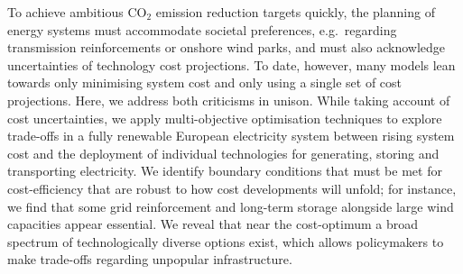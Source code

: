 To achieve ambitious CO$_2$ emission reduction targets quickly, the planning of
energy systems must accommodate societal preferences, e.g.~regarding
transmission reinforcements or onshore wind parks, and must also acknowledge
uncertainties of technology cost projections. To date, however, many models lean
towards only minimising system cost and only using a single set of cost
projections. Here, we address both criticisms in unison. While taking account of
cost uncertainties, we apply multi-objective optimisation techniques to explore
trade-offs in a fully renewable European electricity system between rising
system cost and the deployment of individual technologies for generating,
storing and transporting electricity. We identify boundary conditions that must
be met for cost-efficiency that are robust to how cost developments will unfold;
for instance, we find that some grid reinforcement and long-term storage
alongside large wind capacities appear essential. We reveal that near the
cost-optimum a broad spectrum of technologically diverse options exist, which
allows policymakers to make trade-offs regarding unpopular infrastructure.

